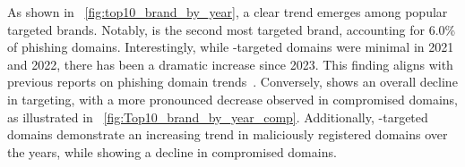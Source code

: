As shown in ~\autoref{fig:top10_brand_by_year}, a clear trend emerges among popular targeted brands. 
Notably,  is the second most targeted brand, accounting for 6.0\% of phishing domains. 
Interestingly, while -targeted domains were minimal in 2021 and 2022, there has been a dramatic increase since 2023. 
This finding aligns with previous reports on phishing domain trends~\cite{Phishing18:online}. 
Conversely,  shows an overall decline in targeting, with a more pronounced decrease observed in compromised domains, as illustrated in ~\autoref{fig:Top10_brand_by_year_comp}. 
Additionally, -targeted domains demonstrate an increasing trend in maliciously registered domains over the years, while showing a decline in compromised domains. 
% 







